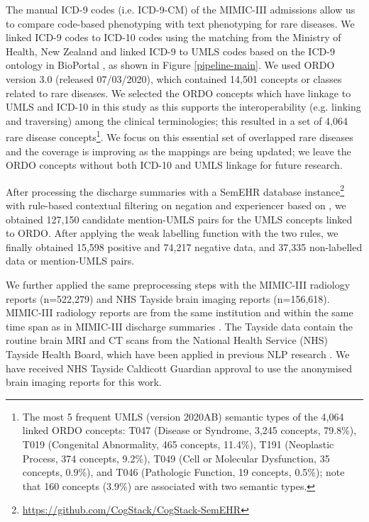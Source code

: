 \documentclass[twocolumn]{bmcart}
\begin{document}
The manual ICD-9 codes (i.e. ICD-9-CM) of the MIMIC-III admissions allow us to compare code-based phenotyping with text phenotyping for rare diseases. We linked ICD-9 codes to ICD-10 codes using the matching from the Ministry of Health, New Zealand \cite{icd9to10newzeland} and linked ICD-9 to UMLS codes based on the ICD-9 ontology in BioPortal \cite{icd9ontology}, as shown in Figure \ref{pipeline-main}. We used ORDO version 3.0 (released 07/03/2020), which contained 14,501 concepts or classes related to rare diseases. We selected the ORDO concepts which have linkage to UMLS and ICD-10 in this study as this supports the interoperability (e.g. linking and traversing) among the clinical terminologies; this resulted in a set of 4,064 rare disease concepts\footnote{The most 5 frequent UMLS (version 2020AB) semantic types of the 4,064 linked ORDO concepts: T047 (Disease or Syndrome, 3,245 concepts,  79.8\%), T019 (Congenital Abnormality, 465 concepts, 11.4\%), T191 (Neoplastic Process, 374 concepts, 9.2\%), T049 (Cell or Molecular Dysfunction, 35 concepts, 0.9\%), and T046 (Pathologic Function, 19 concepts, 0.5\%); note that 160 concepts (3.9\%) are associated with two semantic types.}. We focus on this essential set of overlapped rare diseases and the coverage is improving as the mappings are being updated; we leave the ORDO concepts without both ICD-10 and UMLS linkage for future research.

After processing the discharge summaries with a SemEHR database instance\footnote{\url{https://github.com/CogStack/CogStack-SemEHR}} \cite{Wu2018semehr} with rule-based contextual filtering on negation and experiencer based on \cite{Harkema2009context}, we obtained 127,150 candidate mention-UMLS pairs for the UMLS concepts linked to ORDO. After applying the weak labelling function with the two rules, we finally obtained 15,598 positive and 74,217 negative data, and 37,335 non-labelled data or mention-UMLS pairs.

We further applied the same preprocessing steps with the MIMIC-III radiology reports (n=522,279) and NHS Tayside brain imaging reports (n=156,618). MIMIC-III radiology reports are from the same institution and within the same time span as in MIMIC-III discharge summaries \cite{johnson_mimic-iii_2016}. The Tayside data contain the routine brain MRI and CT scans from the National Health Service (NHS) Tayside Health Board, which have been applied in previous NLP research \cite{gorinski_named_2019,sykes2021}. We have received NHS Tayside Caldicott Guardian approval to use the anonymised brain imaging reports for this work. 
\end{document}
